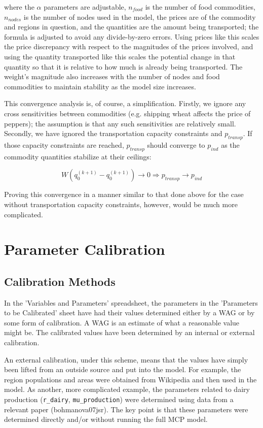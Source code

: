 \documentclass[letter,12pt]{article}
\begin{document}
\noindent where the $\alpha$ parameters are adjustable, $n_{food}$ is the number of food commodities, $n_{nodes}$ is the number of nodes used in the model, the prices are of the commodity and regions in question, and the quantities are the amount being transported; the formula is adjusted to avoid any divide-by-zero errors.  Using prices like this scales the price discrepancy with respect to the magnitudes of the prices involved, and using the quantity transported like this scales the potential change in that quantity so that it is relative to how much is already being transported.  The weight's magnitude also increases with the number of nodes and food commodities to maintain stability as the model size increases.

This convergence analysis is, of course, a simplification.  Firstly, we ignore any cross sensitivities between commodities (e.g. shipping wheat affects the price of peppers); the assumption is that any such sensitivities are relatively small.  Secondly, we have ignored the transportation capacity constraints and $p_{transp}$.  If those capacity constraints are reached, $p_{transp}$ should converge to $p_{ind}$ as the commodity quantities stabilize at their ceilings:

\begin{equation}
W \left(q_0^{\left(k+1\right)} - q_0^{\left(k+1\right)}\right) \rightarrow 0 \Rightarrow p_{transp} \rightarrow p_{ind}
\end{equation}

Proving this convergence in a manner similar to that done above for the case without transportation capacity constraints, however, would be much more complicated.

\section{Parameter Calibration}

\subsection{Calibration Methods}

In the 'Variables and Parameters' spreadsheet, the parameters in the 'Parameters to be Calibrated' sheet have had their values determined either by a WAG or by some form of calibration.  A WAG is an estimate of what a reasonable value might be.  The calibrated values have been determined by an internal or external calibration.  

An external calibration, under this scheme, means that the values have simply been lifted from an outside source and put into the model.  For example, the region populations and areas were obtained from Wikipedia and then used in the model.  As another, more complicated example, the parameters related to dairy production (\verb!r_dairy!, \verb!mu_production!) were determined using data from a relevant paper (bohmanova07jsr).  The key point is that these parameters were determined directly and/or without running the full MCP model.
\end{document}
